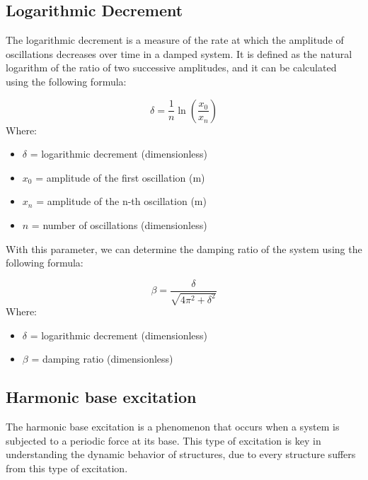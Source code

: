 \documentclass{article}  %
\begin{document}
\subsection{Logarithmic Decrement}
The logarithmic decrement is a measure of the rate at which the amplitude of oscillations decreases over time in a damped system. It is defined as the natural logarithm of the ratio of two successive amplitudes, and it can be calculated using the following formula:

\begin{equation}
\delta = \frac{1}{n} \ln \left( \frac{x_0}{x_n} \right)
\end{equation}
Where:
\begin{itemize}
  \item $\delta$ = logarithmic decrement (dimensionless)
  \item $x_0$ = amplitude of the first oscillation (m)
  \item $x_n$ = amplitude of the n-th oscillation (m)
  \item $n$ = number of oscillations (dimensionless)
\end{itemize}

With this parameter, we can determine the damping ratio of the system using the following formula:

\begin{equation}
\beta = \frac{\delta}{\sqrt{4\pi^2 + \delta^2}}
\label{eq:log_dec}
\end{equation}
Where:
\begin{itemize}
  \item $\delta$ = logarithmic decrement (dimensionless)
  \item $\beta$ = damping ratio (dimensionless)
\end{itemize}

\subsection{Harmonic base excitation}
The harmonic base excitation is a phenomenon that occurs when a system is subjected to a periodic force at its base. This type of excitation is key in understanding the dynamic behavior of structures, due to every structure suffers from this type of excitation. 
\end{document}
